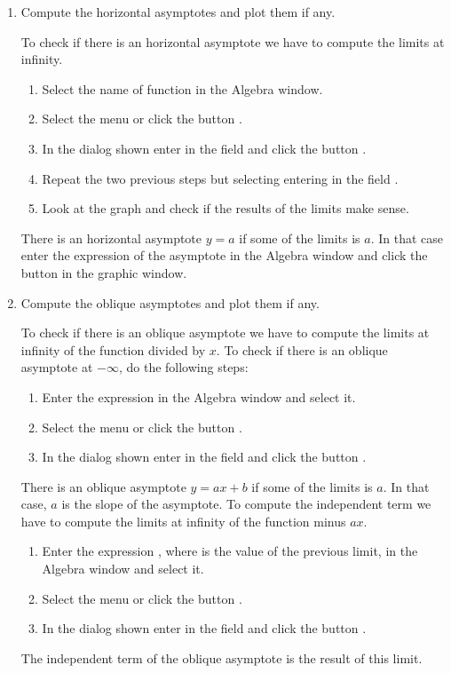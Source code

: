 \begin{enumerate}[leftmargin=*]
\begin{enumerate}
\item Compute the horizontal asymptotes and plot them if any.
\begin{indication}
To check if there is an horizontal asymptote we have to compute the limits at infinity.
\begin{enumerate}
\item Select the name of function in the Algebra window.
\item Select the menu  or click the button .
\item In the dialog shown enter  in the field  and click the button . 
\item Repeat the two previous steps but selecting entering  in the field .
\item Look at the graph and check if the results of the limits make sense. 
\end{enumerate}
There is an horizontal asymptote $y=a$ if some of the limits is $a$.
In that case enter the expression of the asymptote in the Algebra window and click the button  in the graphic window. 
\end{indication}

\item Compute the oblique asymptotes and plot them if any.
\begin{indication}
To check if there is an oblique asymptote we have to compute the limits at infinity of the function divided by $x$.
To check if there is an oblique asymptote at $-\infty$, do the following steps:
\begin{enumerate}
\item Enter the expression  in the Algebra window and select it.
\item Select the menu  or click the button .
\item In the dialog shown enter  in the field  and click the button . 
\end{enumerate}
There is an oblique asymptote $y=ax+b$ if some of the limits is $a$.
In that case, $a$ is the slope of the asymptote. 
To compute the independent term we have to compute the limits at infinity of the function minus $ax$.
\begin{enumerate}
\item Enter the expression , where  is the value of the previous limit, in the Algebra window and select it.
\item Select the menu  or click the button .
\item In the dialog shown enter  in the field  and click the button . 
\end{enumerate}
The independent term of the oblique asymptote is the result of this limit.


\end{indication}
\end{enumerate}
\end{enumerate}
